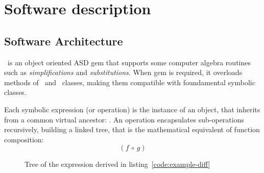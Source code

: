 
\section{Software description}
\label{sec:description}


\subsection{Software Architecture}
\label{sec:architecture}


\ragnicas~is an object oriented ASD gem that supports some computer algebra routines such as \emph{simplifications} and \emph{substitutions}. When gem is required, it overloads methods of \Fixnum~and \Float~classes, making them compatible with foundamental symbolic classes.

Each symbolic expression (or operation) is the instance of an object, that inherits from a common virtual ancestor: \CASOp. An operation encapsulates sub-operations recursively, building a linked tree, that is the mathematical equivalent of function composition:
\begin{equation}
\left( f \, \circ \, g \right)
\end{equation}

\begin{figure}[ht!]
\centering

\caption{\label{fig:graph}Tree of the expression derived in listing~\ref{code:example-diff}}
\end{figure}

